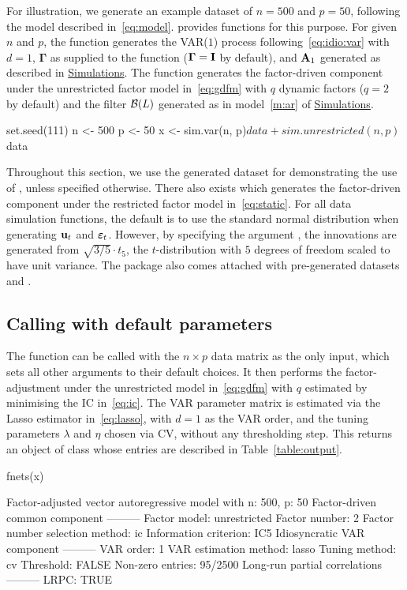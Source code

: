 For illustration, we generate an example dataset of $n = 500$ and $p = 50$, following the model described in~\eqref{eq:model}.
 provides functions for this purpose. 
For given $n$ and $p$, the function  generates the VAR($1$) process following~\eqref{eq:idio:var} with $d = 1$, $\bm\Gamma$ as supplied to the function ($\bm\Gamma = \mathbf I$ by default),
and $\mathbf A_1$ generated as described in \hyperref[sec:sim]{Simulations}.
The function  generates the factor-driven component under the unrestricted factor model in~\eqref{eq:gdfm} with $q$ dynamic factors ($q = 2$ by default) and the filter $\mathcal B(L)$ generated as in model~\ref{m:ar} of \hyperref[sec:sim]{Simulations}.
\begin{example}
set.seed(111)
n <- 500
p <- 50
x <- sim.var(n, p)$data + sim.unrestricted(n, p)$data
\end{example} 
Throughout this section, we use the generated dataset for demonstrating the use of , unless specified otherwise.
There also exists  which generates the factor-driven component under the restricted factor model in~\eqref{eq:static}.
For all data simulation functions, the default is to use the standard normal distribution when generating $\mathbf u_t$ and $\bm{\varepsilon}_t$.
However, by specifying the argument , the innovations are generated from $\sqrt{3/5} \cdot t_5$, the $t$-distribution with $5$ degrees of freedom scaled to have unit variance.
The package also comes attached with pre-generated datasets  and .

\subsection{Calling  with default parameters}

The function  can be called with the $n \times p$ data matrix  as the only input, which sets all other arguments to their default choices.
It then performs the factor-adjustment under the unrestricted model in~\eqref{eq:gdfm} with $q$ estimated by minimising the IC in~\eqref{eq:ic}.
The VAR parameter matrix is estimated via the Lasso estimator in~\eqref{eq:lasso}, with $d = 1$ as the VAR order, and the tuning parameters $\lambda$ and $\eta$ chosen via CV, without any thresholding step.
This returns an object of class  whose entries are described in Table~\ref{table:output}.
\begin{example}
fnets(x)

Factor-adjusted vector autoregressive model with 
n: 500, p: 50
Factor-driven common component --------- 
Factor model: unrestricted
Factor number: 2
Factor number selection method: ic
Information criterion: IC5
Idiosyncratic VAR component --------- 
VAR order: 1
VAR estimation method: lasso
Tuning method: cv
Threshold: FALSE
Non-zero entries: 95/2500
Long-run partial correlations --------- 
LRPC: TRUE
\end{example} 

